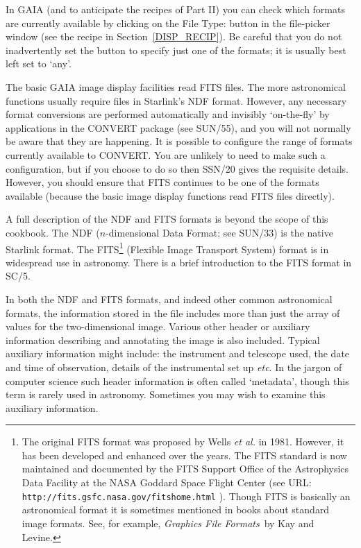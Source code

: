 \documentclass[twoside,11pt]{article}
\newcommand{\htmladdnormallink}[2]{#1}
\newcommand{\xref}[3]{#1}
\renewcommand{\_}{\texttt{\symbol{95}}}
\begin{document}
In GAIA (and to anticipate the recipes of Part II) you can check which
formats are currently available by clicking on the {\sf File Type:} button
in the file-picker window (see the recipe in Section~\ref{DISP_RECIP}).
Be careful that you do not inadvertently set the button to specify just one
of the formats; it is usually best left set to `{\sf any}'.

The basic GAIA image display facilities read FITS files.  The more
astronomical functions usually require files in Starlink's NDF format.
However, any necessary format conversions are performed automatically and
invisibly `on-the-fly' by applications in the CONVERT package (see
\xref{SUN/55}{sun55}{}\cite{SUN55}), and you will not normally be aware
that they are happening.  It is possible to configure the range of formats
currently available to CONVERT.  You are unlikely to need to make such a
configuration, but if you choose to do so then
\xref{SSN/20}{ssn20}{}\cite{SSN20} gives the requisite details.  However,
you should ensure that FITS continues to be one of the formats available
(because the basic image display functions read FITS files directly).

A full description of the NDF and FITS formats is beyond the scope of this
cookbook.  The NDF ($n$-dimensional Data Format; see
\xref{SUN/33}{sun33}{}\cite{SUN33}) is the native Starlink format.
The FITS\footnote{The original FITS format was proposed by Wells {\it et
al.}\/\cite{WELLS81} in 1981.  However, it has been developed and enhanced
over the years.  The FITS standard is now maintained and documented by the
FITS Support Office of the Astrophysics Data Facility at the NASA Goddard
Space Flight Center (see URL: 
\htmladdnormallink{ {\tt http://fits.gsfc.nasa.gov/fits\_home.html} }
{http://fits.gsfc.nasa.gov/fits_home.html}).
Though FITS is basically an astronomical format it is sometimes mentioned
in books about standard image formats.  See, for example, {\it Graphics
File Formats}\, by Kay and Levine\cite{KAY95}.} (Flexible Image Transport
System) format is in widespread use in astronomy.  There is a brief
\xref{introduction to the FITS format}{sc5}{FITS} in
\xref{SC/5}{sc5}{}\cite{SC5}.

In both the NDF and FITS formats, and indeed other common astronomical
formats, the information stored in the file includes more than just the
array of values for the two-dimensional image.  Various other header or
auxiliary information describing and annotating the image is also included.
Typical auxiliary information might include: the instrument and telescope
used, the date and time of observation, details of the instrumental set up
\emph{etc}.  In the jargon of computer science such header information is
often called `metadata', though this term is rarely used in astronomy.
Sometimes you may wish to examine this auxiliary information.
\end{document}
